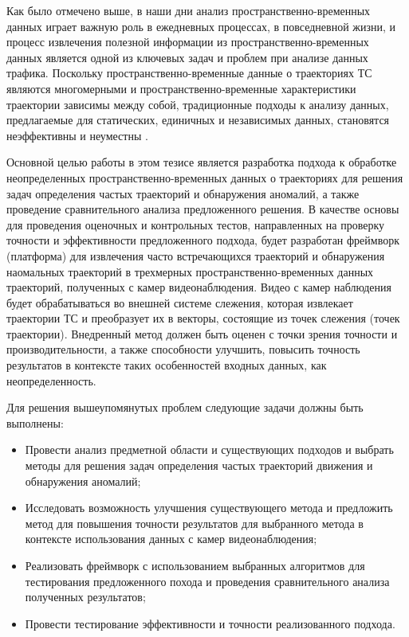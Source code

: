 Как было отмечено выше, в наши дни анализ пространственно-временных данных играет важную роль в ежедневных процессах, в повседневной жизни, и процесс извлечения полезной информации из пространственно-временных данных является одной из ключевых задач и проблем при анализе данных трафика. Поскольку пространственно-временные данные о траекториях ТС являются многомерными и пространственно-временные характеристики траектории зависимы между собой, традиционные подходы к анализу данных, предлагаемые для статических, единичных и независимых данных, становятся неэффективны и неуместны \cite{article:8_review_mot_cl_alg}. 

Основной целью работы в этом тезисе является разработка подхода к обработке неопределенных пространственно-временных данных о траекториях для решения задач определения частых траекторий и обнаружения аномалий, а также проведение сравнительного анализа предложенного решения. В качестве основы для проведения оценочных и контрольных тестов, направленных на проверку точности и эффективности предложенного подхода, будет разработан фреймворк (платформа) для извлечения часто встречающихся траекторий и обнаружения наомальных траекторий в трехмерных пространственно-временных данных траекторий, полученных с камер видеонаблюдения. Видео с камер наблюдения будет обрабатываться во внешней системе слежения, которая извлекает траектории ТС и преобразует их в векторы, состоящие из точек слежения (точек траектории). Внедренный метод должен быть оценен с точки зрения точности и производительности, а также способности улучшить, повысить точность результатов в контексте таких особенностей входных данных, как неопределенность.

Для решения вышеупомянутых проблем следующие задачи должны быть выполнены:

\begin{itemize}
	\item Провести анализ предметной области и существующих подходов и выбрать методы для решения задач определения частых траекторий движения и обнаружения аномалий;
	\item Исследовать возможность улучшения существующего метода и предложить метод для повышения точности результатов для выбранного метода в контексте использования данных с камер видеонаблюдения;
	\item Реализовать фреймворк с использованием выбранных алгоритмов для тестирования предложенного похода и проведения сравнительного анализа полученных результатов;
	\item Провести тестирование эффективности и точности реализованного подхода.
\end{itemize}

